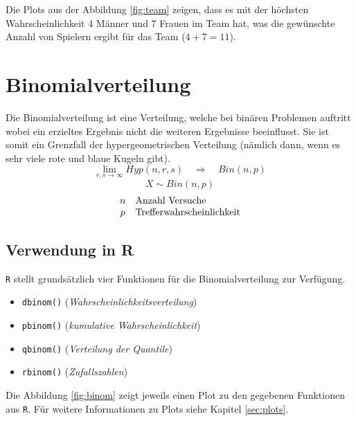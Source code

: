 \noindent
Die Plots aus der Abbildung \ref{fig:team} zeigen, dass es mit der 
höchsten Wahrscheinlichkeit
4 Männer und 7 Frauen im Team hat, was die gewünschte Anzahl von Spielern
ergibt für das Team ($4+7=11$). 

\clearpage
\newpage
\section{Binomialverteilung}
Die Binomialverteilung ist eine Verteilung, welche bei binären Problemen
auftritt wobei ein erzieltes Ergebnis nicht die weiteren Ergebnisse
beeinflusst. Sie ist somit ein Grenzfall der hypergeometrischen 
Verteilung (nämlich dann, wenn es sehr viele rote und blaue 
Kugeln gibt).
\[ 
	\lim_{r,s \rightarrow \infty} Hyp(n,r,s) 
	\quad \Rightarrow \quad Bin(n,p)
\]
\[ 
	X \sim Bin(n,p)
\]
\[ \begin{array}{c l} 
	n & \text{Anzahl Versuche} \\
	p & \text{Trefferwahrscheinlichkeit}
\end{array} \]

\subsection{Verwendung in R}
\lstinline{R} stellt grundsätzlich vier Funktionen für die 
Binomialverteilung zur Verfügung. 
\begin{itemize}
	\item \lstinline{dbinom()} \hfill{} 
		(\emph{Wahrscheinlichkeitsverteilung})
	\item \lstinline{pbinom()} \hfill{}
		(\emph{kumulative Wahrscheinlichkeit})
	\item \lstinline{qbinom()} \hfill{}
		(\emph{Verteilung der Quantile})
	\item \lstinline{rbinom()} \hfill{}
		(\emph{Zufallszahlen})
\end{itemize}
Die Abbildung \ref{fig:binom} zeigt jeweils einen Plot zu den gegebenen
Funktionen aus \lstinline{R}. Für weitere Informationen zu Plots siehe
Kapitel \ref{sec:plots}.





